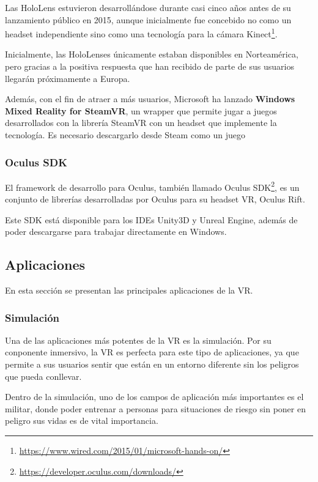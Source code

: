 Las HoloLens estuvieron desarrollándose durante casi cinco años antes de su lanzamiento público en 2015, aunque inicialmente fue concebido no como un headset independiente sino como una tecnología para la cámara Kinect\footnote{\url{https://www.wired.com/2015/01/microsoft-hands-on/}}.

Inicialmente, las HoloLenses únicamente estaban disponibles en Norteamérica, pero gracias a la positiva respuesta que han recibido de parte de sus usuarios llegarán próximamente a Europa.

Además, con el fin de atraer a más usuarios, Microsoft ha lanzado \textbf{Windows Mixed Reality for SteamVR}, un wrapper que permite jugar a juegos desarrollados con la librería SteamVR con un headset que implemente la tecnología. Es necesario descargarlo desde Steam como un juego 

\subsubsection{Oculus SDK}

El framework de desarrollo para Oculus, también llamado Oculus SDK\footnote{\url{https://developer.oculus.com/downloads/}}, es un conjunto de librerías desarrolladas por Oculus para su headset \acs{VR}, Oculus Rift.

Este \acs{SDK} está disponible para los IDEs Unity3D y Unreal Engine, además de poder descargarse para trabajar directamente en Windows.
    

\subsection{Aplicaciones}

En esta sección se presentan las principales aplicaciones de la \acs{VR}.

\subsubsection{Simulación}

Una de las aplicaciones más potentes de la \acs{VR} es la simulación. Por su conponente inmersivo, la \acs{VR} es perfecta para este tipo de aplicaciones, ya que permite a sus usuarios sentir que están en un entorno diferente sin los peligros que pueda conllevar.

Dentro de la simulación, uno de los campos de aplicación más importantes es el militar, donde poder entrenar a personas para situaciones de riesgo sin poner en peligro sus vidas es de vital importancia.

